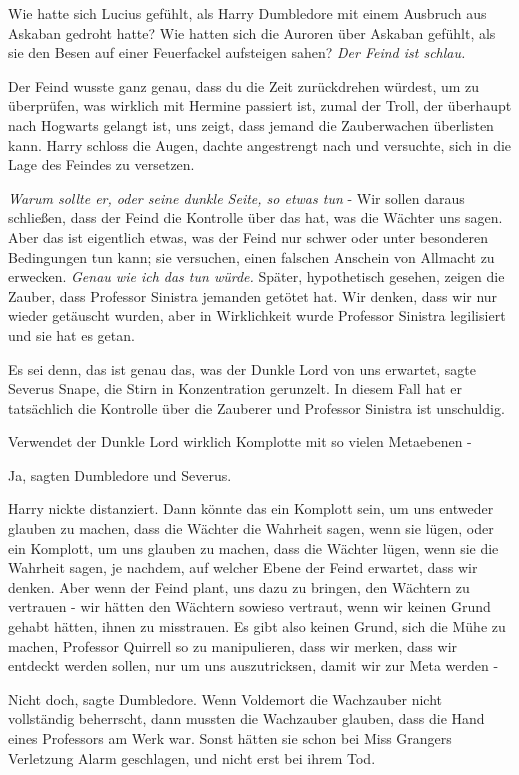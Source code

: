 Wie hatte sich Lucius gefühlt, als Harry Dumbledore mit einem Ausbruch aus
Askaban gedroht hatte? Wie hatten sich die Auroren über Askaban gefühlt, als sie
den Besen auf einer Feuerfackel aufsteigen sahen?
\emph{Der Feind ist schlau.}

\glqq Der Feind wusste ganz genau, dass du die Zeit zurückdrehen würdest, um zu
überprüfen, was wirklich mit Hermine passiert ist, zumal der Troll, der
überhaupt nach Hogwarts gelangt ist, uns zeigt, dass jemand die Zauberwachen
überlisten kann.\grqq{} Harry schloss die Augen, dachte angestrengt nach und
versuchte, sich in die Lage des Feindes zu versetzen.

\emph{Warum sollte er, oder seine dunkle Seite, so etwas tun} - \glqq Wir sollen
daraus schließen, dass der Feind die Kontrolle über das hat, was die Wächter uns
sagen. Aber das ist eigentlich etwas, was der Feind nur schwer oder unter
besonderen Bedingungen tun kann; sie versuchen, einen falschen Anschein von
Allmacht zu erwecken.\grqq{}
\emph{Genau wie ich das tun würde.}
\glqq Später, hypothetisch gesehen, zeigen die Zauber, dass Professor Sinistra
jemanden getötet hat. Wir denken, dass wir nur wieder getäuscht wurden, aber in
Wirklichkeit wurde Professor Sinistra legilisiert und sie hat es getan.\grqq{}

\glqq Es sei denn, das ist genau das, was der Dunkle Lord von uns
erwartet\grqq{}, sagte Severus Snape, die Stirn in Konzentration gerunzelt.
\glqq In diesem Fall hat er tatsächlich die Kontrolle über die Zauberer und
Professor Sinistra ist unschuldig.\grqq{}

\glqq Verwendet der Dunkle Lord wirklich Komplotte mit so vielen Metaebenen
-\grqq{}

\glqq Ja\grqq{}, sagten Dumbledore und Severus.

Harry nickte distanziert. \glqq Dann könnte das ein Komplott sein, um uns
entweder glauben zu machen, dass die Wächter die Wahrheit sagen, wenn sie lügen,
oder ein Komplott, um uns glauben zu machen, dass die Wächter lügen, wenn sie
die Wahrheit sagen, je nachdem, auf welcher Ebene der Feind erwartet, dass wir
denken. Aber wenn der Feind plant, uns dazu zu bringen, den Wächtern zu
vertrauen - wir hätten den Wächtern sowieso vertraut, wenn wir keinen Grund
gehabt hätten, ihnen zu misstrauen. Es gibt also keinen Grund, sich die Mühe zu
machen, Professor Quirrell so zu manipulieren, dass wir merken, dass wir
entdeckt werden sollen, nur um uns auszutricksen, damit wir zur Meta werden
-\grqq{}

\glqq Nicht doch\grqq{}, sagte Dumbledore. \glqq Wenn Voldemort die Wachzauber
nicht vollständig beherrscht, dann mussten die Wachzauber glauben, dass die Hand
eines Professors am Werk war. Sonst hätten sie schon bei Miss Grangers
Verletzung Alarm geschlagen, und nicht erst bei ihrem Tod.\grqq{}

